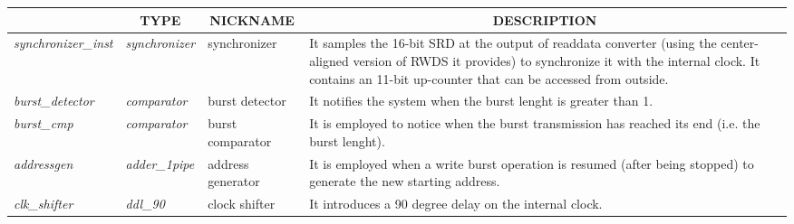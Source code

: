\documentclass[10pt, english, a4paper, titlepage, oneside]{book}
\begin{document}
\begin{table}[H]
    \begin{center}
        \begin{tabular}{|p{3cm}|p{4cm}|p{3.5cm}|p{6cm}|}
            \hline
            \rowcolor{lightgray} \multicolumn{1}{|c|}{NAME} & \multicolumn{1}{|c|}{TYPE} & \multicolumn{1}{|c|}{NICKNAME} & \multicolumn{1}{|c|}{DESCRIPTION} \\
            \hline
            \textit{synchronizer\_inst} & \textit{synchronizer} & synchronizer & It samples the 16-bit SRD at the output of readdata converter (using the center-aligned version of RWDS it provides) to synchronize it with the internal clock. It contains an 11-bit up-counter that can be accessed from outside. \\
            \hline
            \textit{burst\_detector} & \textit{comparator} & burst detector & It notifies the system when the burst lenght is greater than 1. \\
            \hline
            \textit{burst\_cmp} & \textit{comparator} & burst comparator & It is employed to notice when the burst transmission has reached its end (i.e. the burst lenght). \\
            \hline
            \textit{addressgen} & \textit{adder\_1pipe} & address generator & It is employed when a write burst operation is resumed (after being stopped) to generate the new starting address. \\
            \hline
            \textit{clk\_shifter} & \textit{ddl\_90} & clock shifter & It introduces a 90 degree delay on the internal clock. \\
            \hline
        \end{tabular}
    \end{center}
\end{table}
\renewcommand{\arraystretch}{1}
\vspace{2mm}
\end{document}
